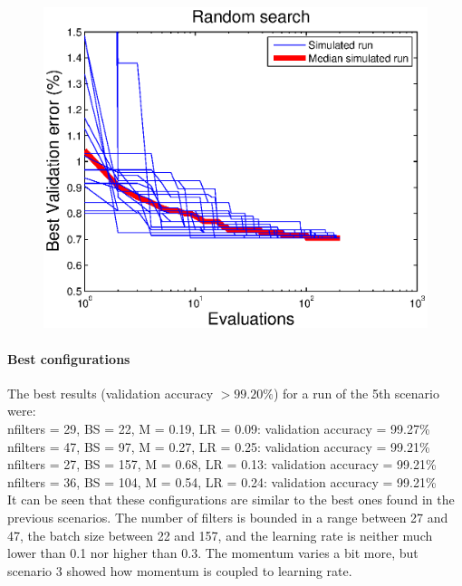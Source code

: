 \documentclass{article}
\begin{document}
    \begin{figure}[!htb]
        \centering
        \includegraphics[width=\textwidth]{figures/sc5}
    \end{figure}
    
    \paragraph{Best configurations}
        The best results (validation accuracy $> 99.20\%$) for a run of the 5th scenario were:
        \vspace{10px}\\
        nfilters = 29, BS = 22, M = 0.19, LR = 0.09: validation accuracy = 99.27\% \\
        nfilters = 47, BS = 97, M = 0.27, LR = 0.25: validation accuracy = 99.21\% \\
        nfilters = 27, BS = 157, M = 0.68, LR = 0.13: validation accuracy = 99.21\% \\
        nfilters = 36, BS = 104, M = 0.54, LR = 0.24: validation accuracy = 99.21\% \\
        
        It can be seen that these configurations are similar to the best ones found in the previous scenarios.
        The number of filters is bounded in a range between 27 and 47, the batch size between 22 and 157, and
        the learning rate is neither much lower than 0.1 nor higher than 0.3. The momentum varies a bit more, but scenario 3 showed how
        momentum is coupled to learning rate.
    
    
    
\end{document}
